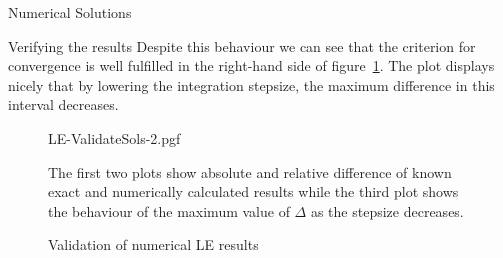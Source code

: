 \begin{section}{Numerical Solutions}
\begin{subsection}{Verifying the results}
Despite this behaviour we can see that the criterion for convergence is well fulfilled in the right-hand side of figure~\ref{fig:4-NumSol-Plt-ValidateLEResults}.
The plot displays nicely that by lowering the integration stepsize, the maximum difference in this interval decreases.
\begin{figure}[H]
	\centering
	{LE-ValidateSols-2.pgf}
	\caption{Validation of numerical LE results}
	The first two plots show absolute and relative difference of known exact and numerically calculated results while the third plot shows the behaviour of the maximum value of $\Delta$ as the stepsize decreases.
	\label{fig:4-NumSol-Plt-ValidateLEResults}
\end{figure}\noindent

\end{subsection}
\end{section}
